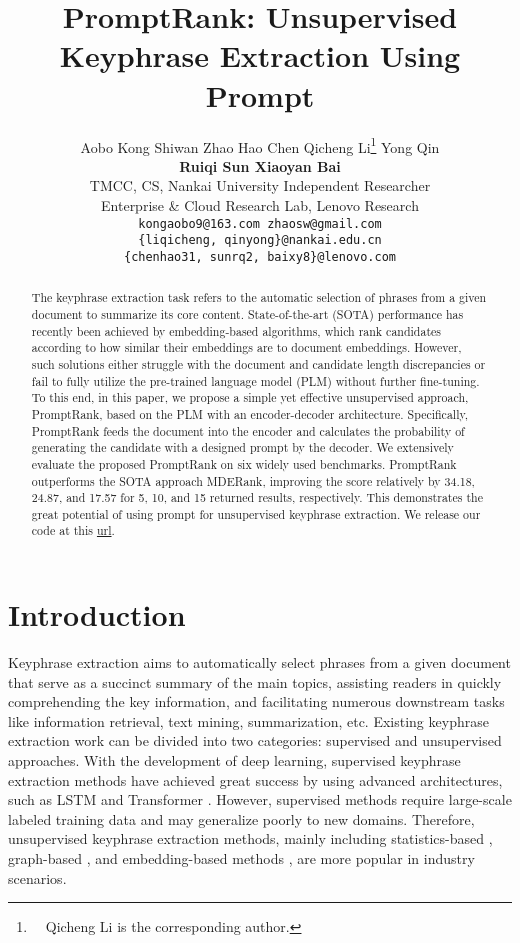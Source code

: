 \documentclass[11pt]{article}
\title{PromptRank: Unsupervised Keyphrase Extraction Using Prompt}
\author{\quad Aobo Kong \quad Shiwan Zhao \quad Hao Chen \quad Qicheng Li\thanks{~~Qicheng Li is the corresponding author.} \quad Yong Qin\\
\textbf{\quad Ruiqi Sun \quad Xiaoyan Bai}\\
TMCC, CS, Nankai University \quad Independent Researcher\\
Enterprise \& Cloud Research Lab, Lenovo Research \\
\texttt{kongaobo9@163.com \quad zhaosw@gmail.com} \\
\texttt{\{liqicheng, qinyong\}@nankai.edu.cn}\\
\texttt{\{chenhao31, sunrq2, baixy8\}@lenovo.com}\\
}
\begin{document}
\maketitle


  
\begin{abstract}

The keyphrase extraction task refers to the automatic selection of phrases from a given document to summarize its core content. State-of-the-art (SOTA) performance has recently been achieved by embedding-based algorithms, which rank candidates according to how similar their embeddings are to document embeddings. However, such solutions either struggle with the document and candidate length discrepancies or fail to fully utilize the pre-trained language model (PLM) without further fine-tuning. To this end, in this paper, we propose a simple yet effective unsupervised approach, PromptRank, based on the PLM with an encoder-decoder architecture. Specifically, PromptRank feeds the document into the encoder and calculates the probability of generating the candidate with a designed prompt by the decoder. We extensively evaluate the proposed PromptRank on six widely used benchmarks. PromptRank outperforms the SOTA approach MDERank, improving the  score relatively by 34.18, 24.87, and 17.57 for 5, 10, and 15 returned results, respectively. This demonstrates the great potential of using prompt for unsupervised keyphrase extraction. We release our code at this \href{https://github.com/HLT-NLP/PromptRank}{url}.
\end{abstract}

\section{Introduction}
\label{sec: intro}



Keyphrase extraction aims to automatically select phrases from a given document that serve as a succinct summary of the main topics, assisting readers in quickly comprehending the key information, and facilitating numerous downstream tasks like information retrieval, text mining, summarization, etc. Existing keyphrase extraction work can be divided into two categories: supervised and unsupervised approaches. With the development of deep learning, supervised keyphrase extraction methods have achieved great success by using advanced architectures, such as LSTM \cite{alzaidy2019bi, sahrawat2020keyphrase} and Transformer \cite{santosh-etal-2020-sasake, nikzad2021phraseformer, martinc2022tnt}. However, supervised methods require large-scale labeled training data and may generalize poorly to new domains. Therefore, unsupervised keyphrase extraction methods, mainly including statistics-based \cite{10.1007/978-3-319-56608-5_37, CAMPOS2020257}, graph-based \cite{bougouin-etal-2013-topicrank, boudin-2018-unsupervised}, and embedding-based methods \cite{bennani-smires-etal-2018-simple, zhang-etal-2022-mderank}, are more popular in industry scenarios.
\end{document}
